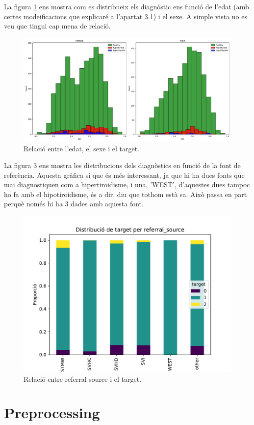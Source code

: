 \documentclass[9pt,a4paper,twoside]{tau-class/tau}
\begin{document}
    La figura \ref{fig:figure2} ens mostra com es distribueix els diagnòstic ens funció de l'edat (amb certes modeificacions que explicaré a l'apartat 3.1) i el sexe. A simple vista no es veu que tingui cap mena de relació.

    \begin{figure}[H]
		\centering
		\includegraphics[width=0.75\columnwidth]{relacio_edat_sexe_target.pdf}
		\caption{Relació entre l'edat, el sexe i el target.}
		\label{fig:figure2}
	\end{figure}

    La figura 3 ens mostra les distribucions dels diagnòstics en funció de la font de referència. Aquesta gràfica sí que és més interessant, ja que hi ha dues fonts que mai diagnostiquen com a hipertiroidisme, i una, 'WEST', d'aquestes dues tampoc ho fa amb el hipotiroidisme, és a dir, diu que tothom està sa. Això passa en part perquè només hi ha 3 dades amb aquesta font.
    \begin{figure}[H]
		\centering
		\includegraphics[width=0.75\columnwidth]{proporcio_referral_source_target.pdf}
		\caption{Relació entre referral source i el target.}
		\label{fig:figure3}
	\end{figure}

\section{Preprocessing}
\end{document}
